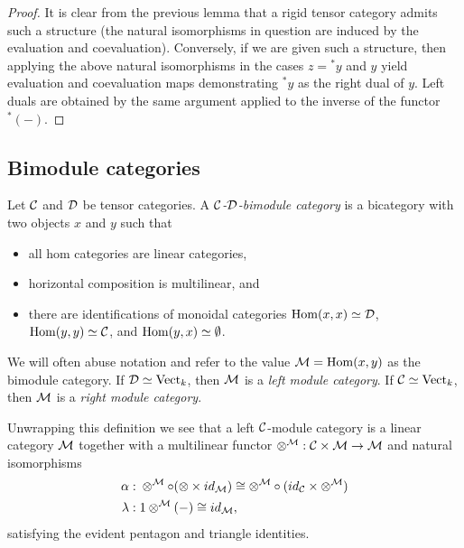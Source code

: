 \documentclass{amsart}
\begin{document}
\begin{proof}
	It is clear from the previous lemma that a rigid tensor category admits such a structure (the natural isomorphisms in question are induced by the evaluation and coevaluation). Conversely, if we are given such a structure, then applying the above natural isomorphisms in the cases $z={}^*y$ and $y$ yield evaluation and coevaluation maps demonstrating ${}^*y$ as the right dual of $y$. Left duals are obtained by the same argument applied to the inverse of the functor ${}^*(-)$.
\end{proof}




\subsection{Bimodule categories}

\begin{definition}
	Let $\mathcal C$ and $\mathcal D$ be tensor categories. A {\em $\mathcal C$-$\mathcal D$-bimodule category} is a bicategory with two objects $x$ and $y$ such that
	\begin{itemize}
		\item all hom categories are linear categories, 
		\item horizontal composition is multilinear, and
		\item there are identifications of monoidal categories $\operatorname{Hom}(x,x) \simeq \mathcal D$, $\operatorname{Hom}(y,y) \simeq \mathcal C$, and $\operatorname{Hom}(y,x) \simeq \emptyset$.
	\end{itemize}
	We will often abuse notation and refer to the value $\mathcal M = \operatorname{Hom}(x,y)$ as the bimodule category. If $\mathcal D \simeq \mathrm{Vect}_k$, then $\mathcal M$ is a {\em left module category}. If $\mathcal C \simeq \mathrm{Vect}_k$, then $\mathcal M$ is a {\em right module category}.
\end{definition}
	
Unwrapping this definition we see that a left $\mathcal C$-module category is a linear category $\mathcal M$ together with a multilinear functor $\otimes^{\mathcal M}: \mathcal C \times \mathcal M \to \mathcal M$ and natural isomorphisms
	\begin{align*}
		\alpha: & \;    \otimes^{\mathcal M} \circ (\otimes \times id_{\mathcal M}) \cong  \otimes^{\mathcal M} \circ (id_{\mathcal C} \times \otimes^{\mathcal M}) \\
		\lambda: & \; 1 \otimes^{\mathcal M}(-) \cong id_{\mathcal M},
	\end{align*}
	satisfying the evident pentagon and triangle identities. 
\end{document}
